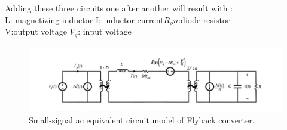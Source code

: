 \documentclass{article}
\newcommand\tab[1][1cm]{\hspace*{#1}}
\begin{document}
Adding these three circuits one after another will result with :\\
L: magnetizing inductor \tab I: inductor current\tab $R_on$:diode resistor\\
V:output voltage \tab $V_g$: input voltage
\begin{figure}[H]
    \centering
    \includegraphics[scale=0.75]{Small-signal.png}
    \caption{Small-signal ac equivalent circuit model of Flyback converter.}
    \label{fig:my_label}
\end{figure}
\newpage
\end{document}
